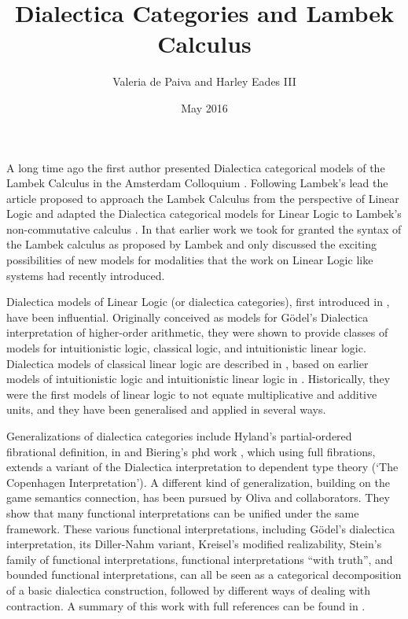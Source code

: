 \documentclass{article}
\title{Dialectica Categories and Lambek Calculus}
\author{Valeria de Paiva and Harley Eades III}
\date{May 2016}
\begin{document}
\maketitle
A long time ago the first author presented  Dialectica categorical models of the Lambek Calculus in the Amsterdam Colloquium \cite{depaiva1991}. Following Lambek's lead the article proposed to approach the
Lambek Calculus from the perspective of Linear Logic and adapted the Dialectica categorical models for Linear Logic to Lambek's non-commutative calculus \cite{lambek1988}. In that earlier work we took for granted the syntax of the Lambek calculus 
as proposed by Lambek and only discussed the exciting possibilities of new models for modalities that the work on Linear Logic like systems had recently introduced.

Dialectica models of Linear Logic (or dialectica categories), first introduced in \cite{depaiva1989}, have been influential. Originally conceived as models for G\"odel's Dialectica interpretation of higher-order arithmetic, they were shown to provide  classes of models for intuitionistic logic, classical logic, and intuitionistic linear logic. Dialectica models
of classical linear logic are described in \cite{depaiva1990}, based on earlier models of intuitionistic logic
and intuitionistic linear logic in \cite{depaiva1989}. Historically, they were the first models of linear logic to not equate multiplicative and additive units, and they have been generalised and applied in several ways. 

Generalizations of dialectica categories include Hyland's partial-ordered fibrational definition, 
in  \cite{hyland2002} and Biering's phd work \cite{biering2008}, which using full fibrations, extends a variant of the Dialectica interpretation to dependent type theory (`The Copenhagen Interpretation'). A different kind of generalization, building on the game semantics connection, has been pursued by Oliva and collaborators. They show that many functional interpretations can be unified under the same framework. These  various functional interpretations, including G\"odel’s dialectica interpretation, its Diller-Nahm variant, Kreisel's modified realizability, Stein’s family of functional interpretations, functional interpretations “with truth”, and bounded functional interpretations, can all be seen as a categorical decomposition of a basic dialectica construction, followed by different ways of dealing with contraction. A summary of this work with full references can be found in \cite{oliva2014}.
\end{document}
